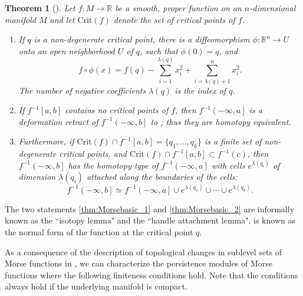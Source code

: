 \documentclass[11pt]{article}
\newcommand{\R}{\mathbb{R}}
\newcommand{\level}[2]{{#1}^{-1}\left({#2}\right)}
\newcommand{\sublevel}[2]{{#1}^{-1}\left(-\infty, {#2}\right]}
\newcommand{\intlevel}[3]{{#1}^{-1}\left[{#2}, {#3}\right]}
\theoremstyle{plain}
\newtheorem{thm}{Theorem}
\theoremstyle{definition}
\theoremstyle{remark}
\begin{document}
\begin{thm}[\cite{milnor_morse_1963}] \label{thm:Morsebasic} Let $f: M \to \R$ be a smooth, proper function on an $n$-dimensional manifold $M$ and let $\mathrm{Crit}(f)$ denote the set of critical points of $f$. 
\begin{enumerate}[label=(M\arabic*), ref=(M\arabic*), start=0]
    \item If $q$ is a non-degenerate critical point, there is a diffeomorphism $\phi : \R^n \to U$ onto an open neighborhood $U$ of $q$, such that $\phi(0) = q$, and
    \begin{equation} \label{eq:Morsebasic}
        f \circ \phi (x) = f(q) - \sum_{i = 1}^{\lambda(q)} x_i^2 + \sum_{i = \lambda(q) + 1}^{n} x_i^2.
    \end{equation}
    The number of negative coefficients $\lambda(q)$ is the \emph{index} of $q$.
    \item  \label{thm:Morsebasic_1} If $\intlevel{f}{a}{b}$ contains no critical points of $f$, then $\sublevel{f}{a}$ is a deformation retract of $\sublevel{f}{b}$ to ; thus they are homotopy equivalent.
    \item  \label{thm:Morsebasic_2}  Furthermore, if $\mathrm{Crit}(f) \cap \intlevel{f}{a}{b} = \{q_1, \ldots, q_k\}$ is a finite set of non-degenerate critical points, and $\mathrm{Crit}(f) \cap \intlevel{f}{a}{b} \subset \level{f}{c}$,  then $\sublevel{f}{b}$ has the homotopy type of $\sublevel{f}{a}$ with cells $e^{\lambda(q_i)}$ of dimension $\lambda(q_i)$ attached along the boundaries of the cells:
    \begin{equation*}
        \sublevel{f}{b} \simeq \sublevel{f}{a} \cup e^{\lambda(q_1)} \cup \cdots \cup e^{\lambda(q_k)}.
    \end{equation*}
\end{enumerate}
\end{thm}
The two statements \ref{thm:Morsebasic_1} and \ref{thm:Morsebasic_2} are informally known as the ``isotopy lemma" and the ``handle attachment lemma".  is known as the normal form of the function at the critical point $q$.

As a consequence of the description of topological changes in sublevel sets of Morse functions in  , we can characterize the persistence modules of Morse functions where the following finiteness conditions hold. Note that the conditions always hold if the underlying manifold is compact. 
\end{document}
